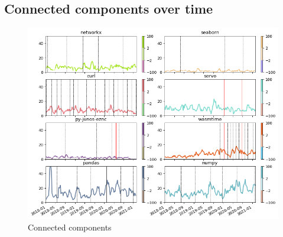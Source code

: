 \begin{appendices}
    \section{Connected components over time}
    \begin{figure}[h!]
       \centering
       \includegraphics[width=\textwidth]{figures/qualitative/connected components/components.png}
       \caption{Connected components}
       \label{fig:components}
    \end{figure}


\end{appendices}
